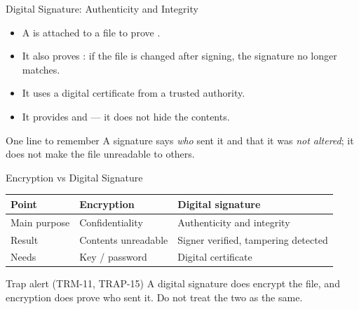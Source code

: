 \documentclass[aspectratio=169]{beamer}
\begin{document}
\begin{frame}{Digital Signature: Authenticity and Integrity}
  \begin{itemize}
    \item A  is attached to a file to prove
      .
    \item It also proves : if the file is changed after
      signing, the signature no longer matches.
    \item It uses a digital certificate from a trusted authority.
    \item It provides  and  --- it does not
      hide the contents.
  \end{itemize}
  \begin{block}{One line to remember}
    A signature says \emph{who} sent it and that it was \emph{not altered};
    it does not make the file unreadable to others.
  \end{block}
\end{frame}

\begin{frame}{Encryption vs Digital Signature}
  \begin{center}
    \begin{tabular}{lll}
      \toprule
      \textbf{Point} & \textbf{Encryption} & \textbf{Digital signature} \\
      \midrule
      Main purpose & Confidentiality & Authenticity and integrity \\
      Result & Contents unreadable & Signer verified, tampering detected \\
      Needs & Key / password & Digital certificate \\
      \bottomrule
    \end{tabular}
  \end{center}
  \vspace{0.35cm}
  \begin{alertblock}{Trap alert (TRM-11, TRAP-15)}
    A digital signature does  encrypt the file, and encryption does
     prove who sent it. Do not treat the two as the same.
  \end{alertblock}
\end{frame}
\end{document}
